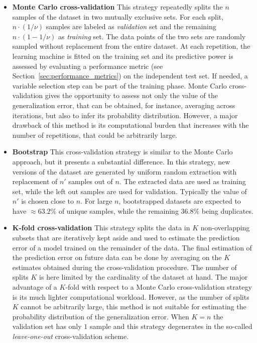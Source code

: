   \begin{itemize}
  	\item[] \textbf{Monte Carlo cross-validation}
  	This strategy repeatedly splits the $n$ samples of the dataset in two mutually exclusive sets. For each split, $n\cdot(1/\nu)$ samples are labeled as \textit{validation} set and the remaining $n\cdot(1 - 1/\nu)$ as \textit{training} set. The data points of the two sets are randomly sampled without replacement from the entire dataset.
  	At each repetition, the learning machine
  	is fitted on the training set and its predictive power is assessed by evaluating a performance metric (see Section~\ref{sec:performance_metrics}) on the independent test set. If needed, a variable selection step can be part of the training phase. Monte Carlo cross-validation gives the opportunity to assess not only the value of the generalization error, that can be obtained, for instance, averaging across iterations, but also to infer its probability distribution. However, a major drawback of this method is its computational burden that increases with the number of repetitions, that could be arbitrarily large.
  	
  	\item[] \textbf{Bootstrap} This cross-validation strategy is similar to the Monte Carlo approach, but it presents a substantial difference. In this strategy, new versions of the dataset are generated by uniform random extraction with replacement of $n'$ samples out of $n$.
  	The extracted data are used as training set, while the left out samples are used for validation.
  	Typically the value of $n'$ is chosen close to $n$. For large $n$, bootstrapped datasets are expected to have $\approx 63.2\%$ of unique samples, while the remaining $36.8\%$ being duplicates.
  	
  	\item[] \textbf{$\bm{K}$-fold cross-validation}
    This strategy splits the data in $K$ non-overlapping subsets that are iteratively kept aside and used to estimate the prediction error of a model trained on the remainder of the data. The final estimation of the prediction error on future data can be done by averaging on the $K$ estimates obtained during the cross-validation procedure. The number of splits $K$ is here limited by the cardinality of the dataset at hand. The major advantage of a $K$-fold with respect to a Monte Carlo cross-validation strategy is its much lighter computational workload. However, as the number of splits $K$ cannot be arbitrarily large, this method is not suitable for estimating the probability distribution of the generalization error.
    When $K=n$ the validation set has only $1$ sample and this strategy degenerates in the so-called \textit{leave-one-out} cross-validation scheme.
  \end{itemize}

